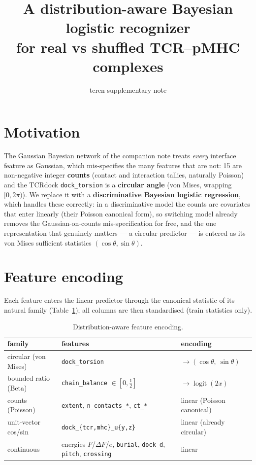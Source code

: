 \documentclass[11pt]{article}
\title{\textbf{A distribution-aware Bayesian logistic recognizer}\\
for real vs shuffled TCR--pMHC complexes}
\author{tcren supplementary note}
\date{}
\begin{document}
\maketitle

\section{Motivation}
The Gaussian Bayesian network of the companion note treats \emph{every} interface feature as Gaussian, which
mis-specifies the many features that are not: 15 are non-negative integer \textbf{counts} (contact and
interaction tallies, naturally Poisson) and the TCRdock \texttt{dock\_torsion} is a \textbf{circular angle}
(von Mises, wrapping $[0,2\pi)$). We replace it with a \textbf{discriminative Bayesian logistic regression},
which handles these correctly: in a discriminative model the counts are covariates that enter linearly (their
Poisson canonical form), so switching model already removes the Gaussian-on-counts mis-specification for free,
and the one representation that genuinely matters --- a circular predictor --- is entered as its von Mises
sufficient statistics $(\cos\theta,\sin\theta)$.

\section{Feature encoding}
Each feature enters the linear predictor through the canonical statistic of its natural family
(Table~\ref{tab:enc}); all columns are then standardised (train statistics only).

\begin{table}[h]\centering\small
\caption{Distribution-aware feature encoding.}\label{tab:enc}
\begin{tabular}{lll}
\toprule
family & features & encoding \\
\midrule
circular (von Mises) & \texttt{dock\_torsion} & $\to (\cos\theta,\ \sin\theta)$ \\
bounded ratio (Beta) & \texttt{chain\_balance} $\in[0,\tfrac12]$ & $\to \operatorname{logit}(2x)$ \\
counts (Poisson) & \texttt{extent}, \texttt{n\_contacts\_*}, \texttt{ct\_*} & linear (Poisson canonical) \\
unit-vector cos/sin & \texttt{dock\_\{tcr,mhc\}\_u\{y,z\}} & linear (already circular) \\
continuous & energies $F$/$\Delta F$/$e$, \texttt{burial}, \texttt{dock\_d}, \texttt{pitch}, \texttt{crossing} & linear \\
\bottomrule
\end{tabular}
\end{table}
\end{document}
